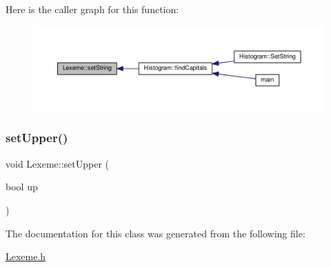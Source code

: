 Here is the caller graph for this function\+:
\nopagebreak
\begin{figure}[H]
\begin{center}
\leavevmode
\includegraphics[width=350pt]{class_lexeme_a90a1a2080fb503b0a206a075fd4d038a_icgraph}
\end{center}
\end{figure}
\mbox{\label{class_lexeme_a09873449eb90bc9be0f4df1edcf97b26}} 
\subsubsection{\texorpdfstring{set\+Upper()}{setUpper()}}
{\footnotesize\ttfamily void Lexeme\+::set\+Upper (\begin{DoxyParamCaption}\item[{bool}]{up }\end{DoxyParamCaption})\hspace{0.3cm}{\ttfamily [inline]}}



The documentation for this class was generated from the following file\+:\begin{DoxyCompactItemize}
\item 
\hyperlink{_lexeme_8h}{Lexeme.\+h}\end{DoxyCompactItemize}
